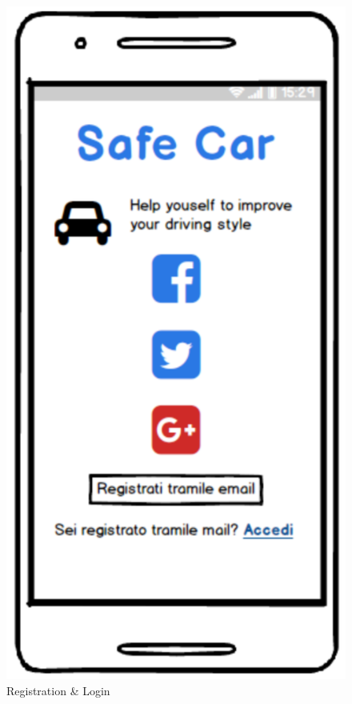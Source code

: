 \begin{figure}[htbp]
\begin{minipage}[b]{0.45\textwidth}
  \end{minipage}
  \hfill
  \begin{minipage}[b]{0.45\textwidth}
    \includegraphics[width=\textwidth]{cpt/img/Login.png}
    \caption{Registration \& Login}
  \end{minipage}
\end{figure}

